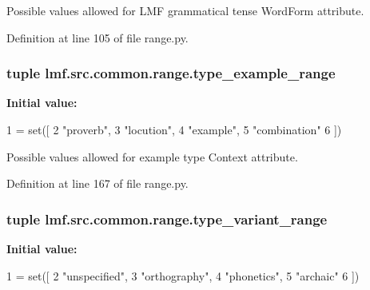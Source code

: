 Possible values allowed for L\+M\+F grammatical tense Word\+Form attribute. 



Definition at line 105 of file range.\+py.

\hypertarget{namespacelmf_1_1src_1_1common_1_1range_ac02d347b39dab64b3ce3604168d1b652}{
\subsubsection[{type\+\_\+example\+\_\+range}]{\setlength{\rightskip}{0pt plus 5cm}tuple lmf.\+src.\+common.\+range.\+type\+\_\+example\+\_\+range}}\label{namespacelmf_1_1src_1_1common_1_1range_ac02d347b39dab64b3ce3604168d1b652}
{\bfseries Initial value\+:}
\begin{DoxyCode}
1 = set([
2     \textcolor{stringliteral}{"proverb"},
3     \textcolor{stringliteral}{"locution"},
4     \textcolor{stringliteral}{"example"},
5     \textcolor{stringliteral}{"combination"}
6 ])
\end{DoxyCode}


Possible values allowed for example type Context attribute. 



Definition at line 167 of file range.\+py.

\hypertarget{namespacelmf_1_1src_1_1common_1_1range_a58f5cff733c3b357e42d3ce87c7080a0}{
\subsubsection[{type\+\_\+variant\+\_\+range}]{\setlength{\rightskip}{0pt plus 5cm}tuple lmf.\+src.\+common.\+range.\+type\+\_\+variant\+\_\+range}}\label{namespacelmf_1_1src_1_1common_1_1range_a58f5cff733c3b357e42d3ce87c7080a0}
{\bfseries Initial value\+:}
\begin{DoxyCode}
1 = set([
2     \textcolor{stringliteral}{"unspecified"},
3     \textcolor{stringliteral}{"orthography"},
4     \textcolor{stringliteral}{"phonetics"},
5     \textcolor{stringliteral}{"archaic"}
6 ])
\end{DoxyCode}


